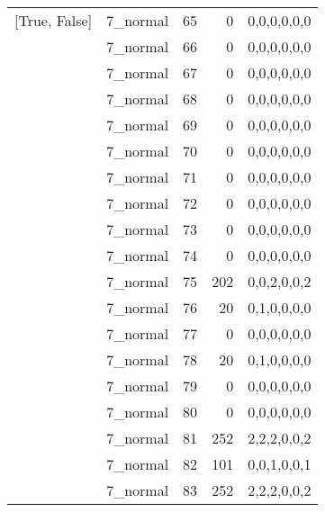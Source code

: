 \begin{tabular}{llrrl}
 [True, False]   & 7\_normal            &            65 &                     0 & 0,0,0,0,0,0   \\
 [True, False]   & 7\_normal            &            66 &                     0 & 0,0,0,0,0,0   \\
 [True, False]   & 7\_normal            &            67 &                     0 & 0,0,0,0,0,0   \\
 [True, False]   & 7\_normal            &            68 &                     0 & 0,0,0,0,0,0   \\
 [True, False]   & 7\_normal            &            69 &                     0 & 0,0,0,0,0,0   \\
 [True, False]   & 7\_normal            &            70 &                     0 & 0,0,0,0,0,0   \\
 [True, False]   & 7\_normal            &            71 &                     0 & 0,0,0,0,0,0   \\
 [True, False]   & 7\_normal            &            72 &                     0 & 0,0,0,0,0,0   \\
 [True, False]   & 7\_normal            &            73 &                     0 & 0,0,0,0,0,0   \\
 [True, False]   & 7\_normal            &            74 &                     0 & 0,0,0,0,0,0   \\
 [True, False]   & 7\_normal            &            75 &                   202 & 0,0,2,0,0,2   \\
 [True, False]   & 7\_normal            &            76 &                    20 & 0,1,0,0,0,0   \\
 [True, False]   & 7\_normal            &            77 &                     0 & 0,0,0,0,0,0   \\
 [True, False]   & 7\_normal            &            78 &                    20 & 0,1,0,0,0,0   \\
 [True, False]   & 7\_normal            &            79 &                     0 & 0,0,0,0,0,0   \\
 [True, False]   & 7\_normal            &            80 &                     0 & 0,0,0,0,0,0   \\
 [True, False]   & 7\_normal            &            81 &                   252 & 2,2,2,0,0,2   \\
 [True, False]   & 7\_normal            &            82 &                   101 & 0,0,1,0,0,1   \\
 [True, False]   & 7\_normal            &            83 &                   252 & 2,2,2,0,0,2   \\

\end{tabular}
